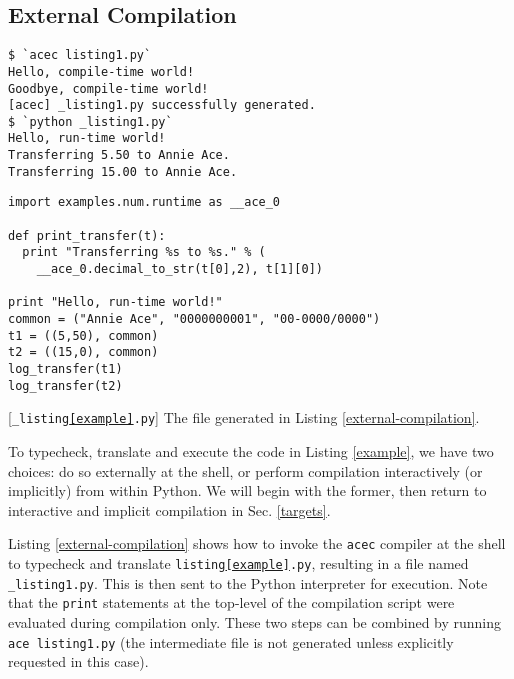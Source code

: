 \documentclass[10pt,preprint]{sigplanconf}
\begin{document}
{\subsection{External Compilation}\label{compilation} 
\begin{codelisting}
\begin{lstlisting}[style=Bash]
$ `acec listing1.py`
Hello, compile-time world!
Goodbye, compile-time world!
[acec] _listing1.py successfully generated.
$ `python _listing1.py`
Hello, run-time world!
Transferring 5.50 to Annie Ace.
Transferring 15.00 to Annie Ace.
\end{lstlisting}
\caption{Compiling \texttt{listing\ref{example}.py} using \texttt{acec}. Both steps can be performed at once by writing \lstinline[style=Bash]{`ace listing1.py`} (line 3 will not be printed with this command).}
\label{external-compilation}
\end{codelisting}
\begin{codelisting}[t]
\begin{lstlisting}
import examples.num.runtime as __ace_0

def print_transfer(t):
  print "Transferring %s to %s." % (
    __ace_0.decimal_to_str(t[0],2), t[1][0])

print "Hello, run-time world!"
common = ("Annie Ace", "0000000001", "00-0000/0000")
t1 = ((5,50), common)
t2 = ((15,0), common)
log_transfer(t1)
log_transfer(t2)
\end{lstlisting}
\caption{[\texttt{\_listing\ref{example}.py}] The file generated in Listing \ref{external-compilation}.}
\label{example-out}
\end{codelisting}

To typecheck, translate and execute the code in Listing \ref{example}, we have two choices: do so externally at the shell, or perform compilation interactively (or implicitly) from within Python. We will begin with the former, then return to interactive and implicit compilation in Sec. \ref{targets}.%

Listing \ref{external-compilation} shows how to invoke the \verb|acec| compiler at the shell to typecheck and translate \texttt{listing\ref{example}.py}, resulting in a file named \verb|_listing1.py|. This is then sent to the  Python interpreter for execution. Note that the {\texttt{print}} statements at the top-level of the  compilation script were evaluated during compilation only. These two steps can be combined by running \verb|ace listing1.py| (the intermediate file is not generated unless explicitly requested in this case).

}
\end{document}
